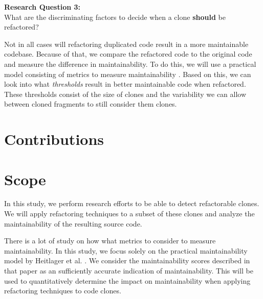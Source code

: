 \begin{displayquote}
\textbf{Research Question 3:}\\What are the discriminating factors to decide when a clone \textbf{should} be refactored?
\end{displayquote}
Not in all cases will refactoring duplicated code result in a more maintainable codebase. Because of that, we compare the refactored code to the original code and measure the difference in maintainability. To do this, we will use a practical model consisting of metrics to measure maintainability \cite{heitlager2007practical}. Based on this, we can look into what \textit{thresholds} result in better maintainable code when refactored. These thresholds consist of the size of clones and the variability we can allow between cloned fragments to still consider them clones.

\section{Contributions}

\section{Scope}
In this study, we perform research efforts to be able to detect refactorable clones. We will apply refactoring techniques to a subset of these clones and analyze the maintainability of the resulting source code.

There is a lot of study on how what metrics to consider to measure maintainability. In this study, we focus solely on the practical maintainability model by Heitlager et al. \cite{heitlager2007practical}. We consider the maintainability scores described in that paper as an sufficiently accurate indication of maintainability. This will be used to quantitatively determine the impact on maintainability when applying refactoring techniques to code clones.

